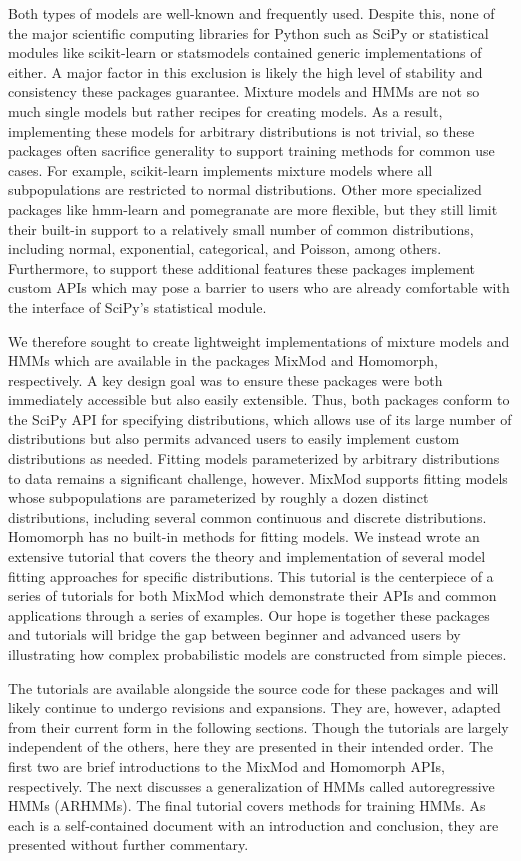 Both types of models are well-known and frequently used. Despite this, none of the major scientific computing libraries for Python such as SciPy or statistical modules like scikit-learn or statsmodels contained generic implementations of either. A major factor in this exclusion is likely the high level of stability and consistency these packages guarantee. Mixture models and HMMs are not so much single models but rather recipes for creating models. As a result, implementing these models for arbitrary distributions is not trivial, so these packages often sacrifice generality to support training methods for common use cases. For example, scikit-learn implements mixture models where all subpopulations are restricted to normal distributions. Other more specialized packages like hmm-learn and pomegranate are more flexible, but they still limit their built-in support to a relatively small number of common distributions, including normal, exponential, categorical, and Poisson, among others. Furthermore, to support these additional features these packages implement custom APIs which may pose a barrier to users who are already comfortable with the interface of SciPy's statistical module.

We therefore sought to create lightweight implementations of mixture models and HMMs which are available in the packages MixMod and Homomorph, respectively. A key design goal was to ensure these packages were both immediately accessible but also easily extensible. Thus, both packages conform to the SciPy API for specifying distributions, which allows use of its large number of distributions but also permits advanced users to easily implement custom distributions as needed. Fitting models parameterized by arbitrary distributions to data remains a significant challenge, however. MixMod supports fitting models whose subpopulations are parameterized by roughly a dozen distinct distributions, including several common continuous and discrete distributions. Homomorph has no built-in methods for fitting models. We instead wrote an extensive tutorial that covers the theory and implementation of several model fitting approaches for specific distributions. This tutorial is the centerpiece of a series of tutorials for both MixMod which demonstrate their APIs and common applications through a series of examples. Our hope is together these packages and tutorials will bridge the gap between beginner and advanced users by illustrating how complex probabilistic models are constructed from simple pieces.

The tutorials are available alongside the source code for these packages and will likely continue to undergo revisions and expansions. They are, however, adapted from their current form in the following sections. Though the tutorials are largely independent of the others, here they are presented in their intended order. The first two are brief introductions to the MixMod and Homomorph APIs, respectively. The next discusses a generalization of HMMs called autoregressive HMMs (ARHMMs). The final tutorial covers methods for training HMMs. As each is a self-contained document with an introduction and conclusion, they are presented without further commentary.
